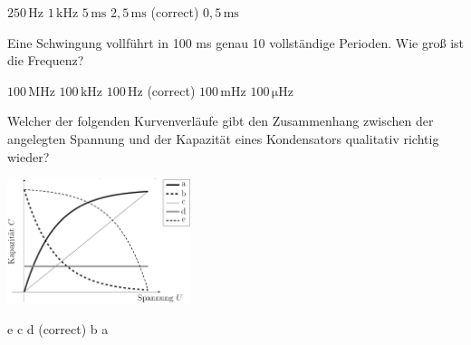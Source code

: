 \documentclass[11pt]{exam}
\begin{document}
\begin{questions}
\begin{choices}
	\choice \(\mathrm{250\,Hz}\)
	\choice \(\mathrm{1\,kHz}\)
	\choice \(\mathrm{5\,ms}\)
	\choice \(\mathrm{2,5\,ms}\) (correct)
	\choice \(\mathrm{0,5\,ms}\)
\end{choices}

\vspace{3mm}\question Eine Schwingung vollführt in 100 ms genau 10 vollständige Perioden. Wie groß ist die Frequenz?

\begin{choices}
	\choice \(\mathrm{100\,MHz}\)
	\choice \(\mathrm{100\,kHz}\)
	\choice \(\mathrm{100\,Hz}\) (correct)
	\choice \(\mathrm{100\,mHz}\)
	\choice \(\mathrm{100\,\mu Hz}\)
\end{choices}

\vspace{3mm}\question Welcher der folgenden Kurvenverläufe gibt den Zusammenhang zwischen der angelegten Spannung und der Kapazität eines Kondensators qualitativ richtig wieder? 

\includegraphics[width=0.4\textwidth]{images/Kondensator-C-U.png}

\begin{choices}
	\choice e
	\choice c
	\choice d (correct)
	\choice b
	\choice a
\end{choices}

\vspace{3mm}\end{questions}
\end{document}
